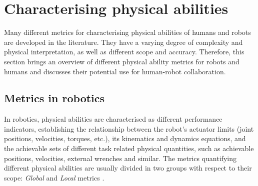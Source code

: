 




\section{Characterising physical abilities}
\label{ch:inro_overview}
Many different metrics for characterising physical abilities of humans and robots are developed in the literature. They have a varying degree of complexity and physical interpretation, as well as different scope and accuracy.
Therefore, this section brings an overview of different physical ability metrics for robots and humans and discusses their potential use for human-robot collaboration.

\subsection{Metrics in robotics}
In robotics, physical abilities are characterised as different performance indicators, establishing the relationship between the robot's actuator limits (joint positions, velocities, torques, etc.), its kinematics and dynamics equations, and the achievable sets of different task related physical quantities, such as achievable positions, velocities, external wrenches and similar. The metrics quantifying different physical abilities are usually divided in two groups with respect to their scope: \textit{Global} and \textit{Local} metrics  \cite{russo2022measuring}. 

